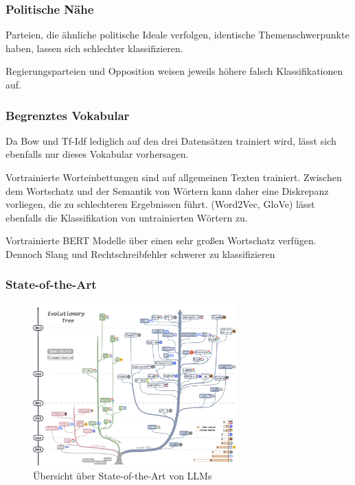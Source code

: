 
\subsubsection{Politische Nähe}


Parteien, die ähnliche politische Ideale verfolgen, identische Themenschwerpunkte haben, lassen sich schlechter klassifizieren.

Regierungsparteien und Opposition weisen jeweils höhere falsch Klassifikationen auf.

\subsubsection{Begrenztes Vokabular}

Da Bow und Tf-Idf lediglich auf den drei Datensätzen trainiert wird, lässt sich ebenfalls nur dieses Vokabular vorhersagen.

Vortrainierte Worteinbettungen sind auf allgemeinen Texten trainiert. Zwischen dem Wortschatz und der Semantik von Wörtern kann daher eine Diskrepanz vorliegen, die zu schlechteren Ergebnissen führt. (Word2Vec, GloVe)
\ft lässt ebenfalls die Klassifikation von untrainierten Wörtern zu.

Vortrainierte BERT Modelle über einen sehr großen Wortschatz verfügen. Dennoch Slang und Rechtschreibfehler schwerer zu klassifizieren

\subsubsection{State-of-the-Art}

\begin{figure}[H]
  \centering
  \includegraphics[width=0.7\textwidth]{data/images/tree.png}
  \caption{Übersicht über State-of-the-Art von \acp{LLM} \autocite{yang_harnessing_2023}} \label{fig:stateOfTheArt}
\end{figure}

